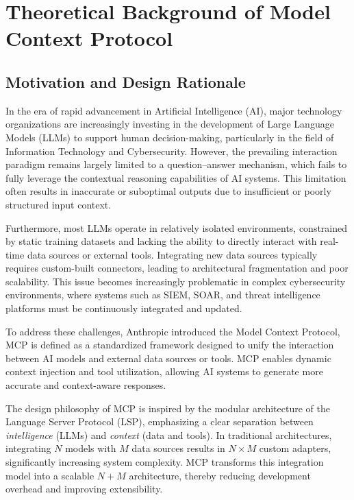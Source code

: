 \documentclass[12pt]{report}
\begin{document}
\section{Theoretical Background of Model Context Protocol}

\subsection{Motivation and Design Rationale}

In the era of rapid advancement in Artificial Intelligence (AI), major technology organizations are increasingly investing in the development of Large Language Models (LLMs) to support human decision-making, particularly in the field of Information Technology and Cybersecurity. However, the prevailing interaction paradigm remains largely limited to a question–answer mechanism, which fails to fully leverage the contextual reasoning capabilities of AI systems. This limitation often results in inaccurate or suboptimal outputs due to insufficient or poorly structured input context.

Furthermore, most LLMs operate in relatively isolated environments, constrained by static training datasets and lacking the ability to directly interact with real-time data sources or external tools. Integrating new data sources typically requires custom-built connectors, leading to architectural fragmentation and poor scalability. This issue becomes increasingly problematic in complex cybersecurity environments, where systems such as SIEM, SOAR, and threat intelligence platforms must be continuously integrated and updated.

To address these challenges, Anthropic introduced the Model Context Protocol, MCP is defined as a standardized framework designed to unify the interaction between AI models and external data sources or tools. MCP enables dynamic context injection and tool utilization, allowing AI systems to generate more accurate and context-aware responses.

The design philosophy of MCP is inspired by the modular architecture of the Language Server Protocol (LSP), emphasizing a clear separation between \textit{intelligence} (LLMs) and \textit{context} (data and tools). In traditional architectures, integrating $N$ models with $M$ data sources results in $N \times M$ custom adapters, significantly increasing system complexity. MCP transforms this integration model into a scalable $N + M$ architecture, thereby reducing development overhead and improving extensibility.
\end{document}
